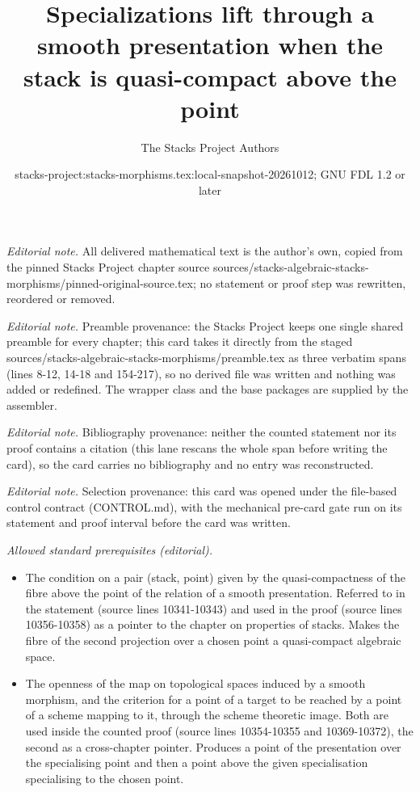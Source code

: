 \documentclass[10pt,a4paper]{amsart}
\title{Specializations lift through a smooth presentation when the stack is quasi-compact above the point}
\author{The Stacks Project Authors}
\date{stacks-project:stacks-morphisms.tex:local-snapshot-20261012; GNU FDL 1.2 or later}
\theoremstyle{plain}
\theoremstyle{definition}
\theoremstyle{remark}
\numberwithin{equation}{subsection}
\begin{document}
\maketitle
\noindent\textit{Editorial note.} All delivered mathematical text is the author's own, copied from the pinned Stacks Project chapter source sources/stacks-algebraic-stacks-morphisms/pinned-original-source.tex; no statement or proof step was rewritten, reordered or removed.\par\medskip
\noindent\textit{Editorial note.} Preamble provenance: the Stacks Project keeps one single shared preamble for every chapter; this card takes it directly from the staged sources/stacks-algebraic-stacks-morphisms/preamble.tex as three verbatim spans (lines 8-12, 14-18 and 154-217), so no derived file was written and nothing was added or redefined. The wrapper class and the base packages are supplied by the assembler.\par\medskip
\noindent\textit{Editorial note.} Bibliography provenance: neither the counted statement nor its proof contains a citation (this lane rescans the whole span before writing the card), so the card carries no bibliography and no entry was reconstructed.\par\medskip
\noindent\textit{Editorial note.} Selection provenance: this card was opened under the file-based control contract (CONTROL.md), with the mechanical pre-card gate run on its statement and proof interval before the card was written.\par\medskip
\noindent\textit{Allowed standard prerequisites (editorial).}\begin{itemize}
\item The condition on a pair (stack, point) given by the quasi-compactness of the fibre above the point of the relation of a smooth presentation. Referred to in the statement (source lines 10341-10343) and used in the proof (source lines 10356-10358) as a pointer to the chapter on properties of stacks. Makes the fibre of the second projection over a chosen point a quasi-compact algebraic space.
\item The openness of the map on topological spaces induced by a smooth morphism, and the criterion for a point of a target to be reached by a point of a scheme mapping to it, through the scheme theoretic image. Both are used inside the counted proof (source lines 10354-10355 and 10369-10372), the second as a cross-chapter pointer. Produces a point of the presentation over the specialising point and then a point above the given specialisation specialising to the chosen point.
\end{itemize}\medskip
\end{document}
